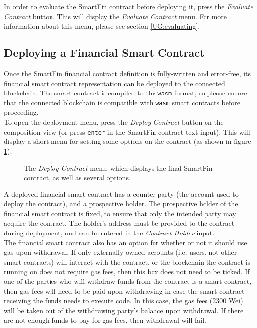 \documentclass{article}
\begin{document}
In order to evaluate the SmartFin contract before deploying it, press the \textit{Evaluate Contract} button. This will display the \textit{Evaluate Contract} menu. For more information about this menu, please see section \ref{UG:evaluating}.


\subsection{Deploying a Financial Smart Contract}

Once the SmartFin financial contract definition is fully-written and error-free, its financial smart contract representation can be deployed to the connected blockchain. The smart contract is compiled to the \texttt{wasm} format, so please ensure that the connected blockchain is compatible with \texttt{wasm} smart contracts before proceeding. \\

To open the deployment menu, press the \textit{Deploy Contract} button on the composition view (or press \texttt{enter} in the SmartFin contract text input). This will display a short menu for setting some options on the contract (as shown in figure \ref{UG:fig:deploy}).

\begin{figure}[h]
    \centering
    \caption{The \textit{Deploy Contract} menu, which displays the final SmartFin contract, as well as several options.}
    \label{UG:fig:deploy}
\end{figure}

A deployed financial smart contract has a counter-party (the account used to deploy the contract), and a prospective holder. The prospective holder of the financial smart contract is fixed, to ensure that only the intended party may acquire the contract. The holder's address must be provided to the contract during deployment, and can be entered in the \textit{Contract Holder} input. \\

The financial smart contract also has an option for whether or not it should use gas upon withdrawal. If only externally-owned accounts (i.e. users, not other smart contracts) will interact with the contract, or the blockchain the contract is running on does not require gas fees, then this box does not need to be ticked. If one of the parties who will withdraw funds from the contract is a smart contract, then gas fees will need to be paid upon withdrawing in case the smart contract receiving the funds needs to execute code. In this case, the gas fees (2300 Wei) will be taken out of the withdrawing party's balance upon withdrawal. If there are not enough funds to pay for gas fees, then withdrawal will fail. \\
\end{document}
